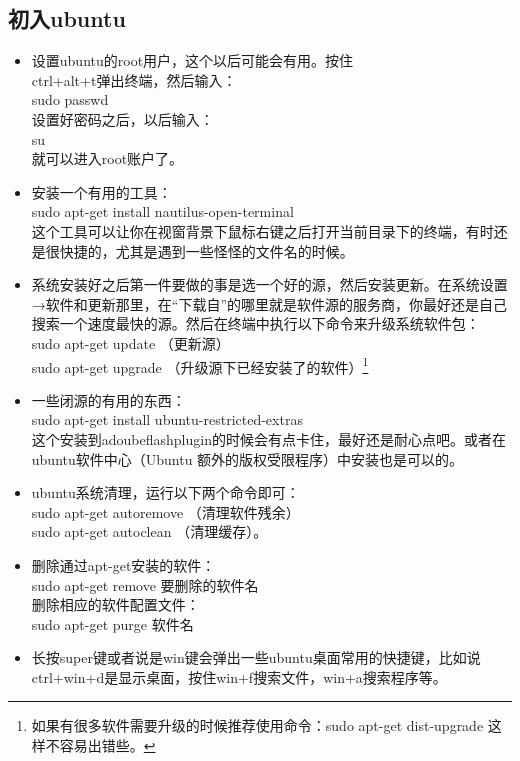 \documentclass[12pt,oneside]{book}
\begin{document}
\begin{common-format}
\section{初入ubuntu}
\begin{itemize}
\item 设置ubuntu的root用户，这个以后可能会有用。按住\\
ctrl+alt+t弹出终端，然后输入：\\ sudo passwd \\设置好密码之后，以后输入：\\ su\\就可以进入root账户了。
\item 安装一个有用的工具：\\sudo apt-get install nautilus-open-terminal\\这个工具可以让你在视窗背景下鼠标右键之后打开当前目录下的终端，有时还是很快捷的，尤其是遇到一些怪怪的文件名的时候。
\item 系统安装好之后第一件要做的事是选一个好的源，然后安装更新。在系统设置→软件和更新那里，在“下载自”的哪里就是软件源的服务商，你最好还是自己搜索一个速度最快的源。然后在终端中执行以下命令来升级系统软件包：\\sudo apt-get update  （更新源）\\sudo apt-get upgrade   （升级源下已经安装了的软件）\footnote{如果有很多软件需要升级的时候推荐使用命令：sudo apt-get dist-upgrade 这样不容易出错些。}
\item 一些闭源的有用的东西：\\sudo apt-get install ubuntu-restricted-extras\\这个安装到adoubeflashplugin的时候会有点卡住，最好还是耐心点吧。或者在ubuntu软件中心（Ubuntu 额外的版权受限程序）中安装也是可以的。
\item ubuntu系统清理，运行以下两个命令即可：\\sudo apt-get autoremove （清理软件残余）\\sudo apt-get autoclean  （清理缓存）。
\item 删除通过apt-get安装的软件：\\sudo apt-get remove 要删除的软件名\\删除相应的软件配置文件：\\sudo apt-get purge 软件名
\item 长按super键或者说是win键会弹出一些ubuntu桌面常用的快捷键，比如说ctrl+win+d是显示桌面，按住win+f搜索文件，win+a搜索程序等。
\end{itemize}


\end{common-format}
\end{document}
